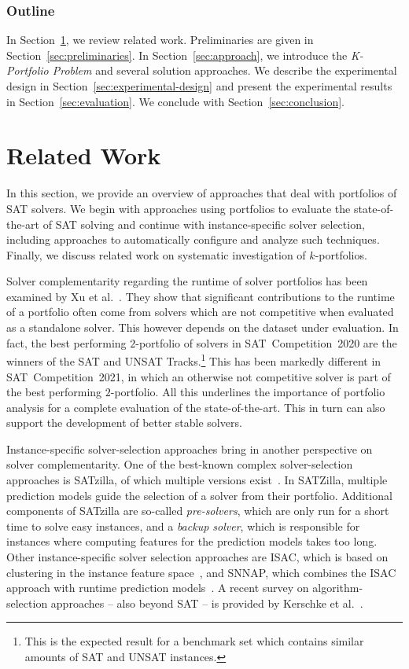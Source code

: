\documentclass[runningheads]{llncs}
\begin{document}
\subsubsection{Outline}

In Section~\ref{sec:related-work}, we review related work. 
Preliminaries are given in Section~\ref{sec:preliminaries}. 
In Section~\ref{sec:approach}, we introduce the \emph{K-Portfolio Problem} and several solution approaches. 
We describe the experimental design in Section~\ref{sec:experimental-design} and present the experimental results in Section~\ref{sec:evaluation}. 
We conclude with Section~\ref{sec:conclusion}. 

\section{Related Work}
\label{sec:related-work}

In this section, we provide an overview of approaches that deal with portfolios of SAT solvers. 
We begin with approaches using portfolios to evaluate the state-of-the-art of SAT solving and continue with instance-specific solver selection, including approaches to automatically configure and analyze such techniques. 
Finally, we discuss related work on systematic investigation of $k$-portfolios. 

Solver complementarity regarding the runtime of solver portfolios has been examined by Xu et al.~\cite{Xu:2012:EvalContribVBS}. 
They show that significant contributions to the runtime of a portfolio often come from solvers which are not competitive when evaluated as a standalone solver. 
This however depends on the dataset under evaluation. 
In fact, the best performing $2$-portfolio of solvers in SAT~Competition~2020 are the winners of the SAT and UNSAT Tracks.\footnote{This is the expected result for a benchmark set which contains similar amounts of SAT and UNSAT instances.} 
This has been markedly different in SAT~Competition~2021, in which an otherwise not competitive solver is part of the best performing $2$-portfolio. 
All this underlines the importance of portfolio analysis for a complete evaluation of the state-of-the-art. 
This in turn can also support the development of better stable solvers.

Instance-specific solver-selection approaches bring in another perspective on solver complementarity.
One of the best-known complex solver-selection approaches is SATzilla, of which multiple versions exist~\cite{xu2008satzilla,xu2012satzilla2012}. 
In SATZilla, multiple prediction models guide the selection of a solver from their portfolio. 
Additional components of SATzilla are so-called \emph{pre-solvers}, which are only run for a short time to solve easy instances, and a \emph{backup solver}, which is responsible for instances where computing features for the prediction models takes too long.
Other instance-specific solver selection approaches are ISAC, which is based on clustering in the instance feature space~\cite{Kadioglu:2010:ISAC}, and SNNAP, which combines the ISAC approach with runtime prediction models~\cite{Collautti:2013:SNNAP}.
A recent survey on algorithm-selection approaches -- also beyond SAT -- is provided by Kerschke et al.~\cite{kerschke2019automated}.
\end{document}

